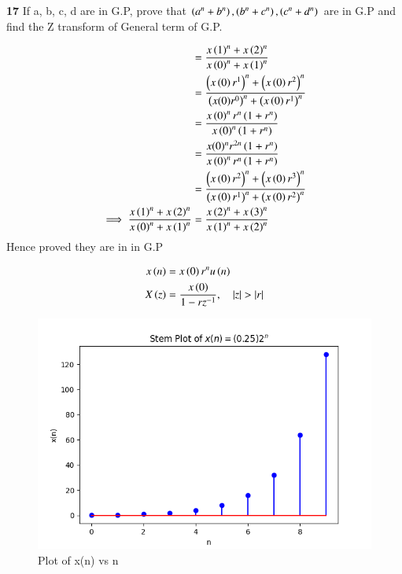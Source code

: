 \documentclass[journal,12pt,twocolumn]{IEEEtran}
\theoremstyle{remark}
\begin{document}


\vspace{3cm}

\title{}
\author{EE23BTECH11047 - Deepakreddy P
}
\maketitle
\newpage
\bigskip

\noindent \textbf{17} \quad 
If a, b, c, d are in G.P, prove that 
$ \left(a^{n} + b^{n}\right),\left(b^{n} + c^{n}\right),\left(c^{n} + d^{n}\right) $ are in G.P and find the Z transform of General term of G.P.\\
\solution

\begin{center}
    \begin{table}[ht]
        
    \end{table}
\end{center}

\begin{align} 
 &=\frac{x\left(1\right)^n + x\left(2\right)^n}{x\left(0\right)^n + x\left(1\right)^n}  \\
&= \frac{\left(x\left(0\right)r^1\right)^n + \left(x\left(0\right)r^2\right)^n}{\left(x(0)r^0\right)^n + \left(x\left(0\right)r^1\right)^n}\\
&= \frac{x\left(0\right)^n r^n \left(1 + r^n\right)}{x\left(0\right)^n \left(1 + r^n\right)} \\
&= \frac{x(0)^n r^{2n} \left(1 + r^n\right)}{x\left(0\right)^n r^n \left(1 + r^n\right)}\\
&= \frac{\left(x\left(0\right) r^2\right)^n + \left(x\left(0\right) r^3\right)^n}{\left(x\left(0\right) r^1\right)^n + \left(x\left(0\right) r^2\right)^n}\\
\implies \frac{x\left(1\right)^n + x\left(2\right)^n}{x\left(0\right)^n + x\left(1\right)^n} &= \frac{x\left(2\right)^n + x\left(3\right)^n}{x\left(1\right)^n + x\left(2\right)^n}
\end{align}
Hence proved they are in in G.P

\begin{align}
    x\brak{n} &= x\brak{0}r^{n} u\brak{n}\\
    X\brak{z} &= \frac{x\brak{0}}{1-rz^{-1}}, \quad |z|>|r|
\end{align}

\begin{figure}[htbp]
   \centering
   \includegraphics[width=1\columnwidth]{figs/gp.png}
   \caption{Plot of x(n) vs n}
   \label{fig: Stem plot of x(n)}
\end{figure}
\end{document}

